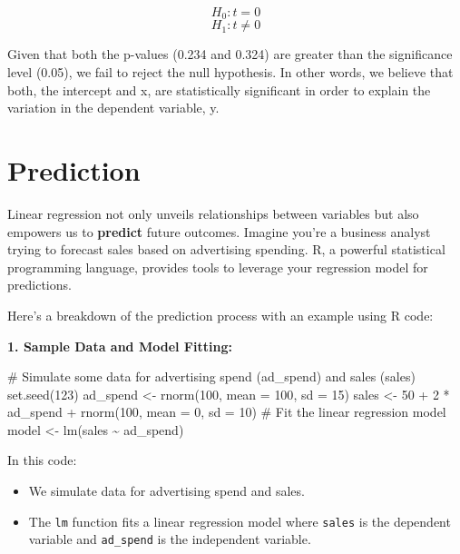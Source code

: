 \documentclass[
  letterpaper,
  paper =a4,
  twoside,
  openright,
  headsepline,
  footsepline,
  listof = totocnumbered,
  chapterprefix = true,
  firstiscover,
  parskip = full*]{scrbook}
\newenvironment{Shaded}{\begin{snugshade}}{\end{snugshade}}
\newcommand{\AttributeTok}[1]{\textcolor[rgb]{0.40,0.45,0.13}{#1}}
\newcommand{\CommentTok}[1]{\textcolor[rgb]{0.37,0.37,0.37}{#1}}
\newcommand{\DecValTok}[1]{\textcolor[rgb]{0.68,0.00,0.00}{#1}}
\newcommand{\FunctionTok}[1]{\textcolor[rgb]{0.28,0.35,0.67}{#1}}
\newcommand{\NormalTok}[1]{\textcolor[rgb]{0.00,0.23,0.31}{#1}}
\newcommand{\OtherTok}[1]{\textcolor[rgb]{0.00,0.23,0.31}{#1}}
\newcommand{\SpecialCharTok}[1]{\textcolor[rgb]{0.37,0.37,0.37}{#1}}
\begin{document}
\[
H_0: t = 0
\] \[
H_1: t \neq 0
\]

Given that both the p-values (0.234 and 0.324) are greater than the
significance level (0.05), we fail to reject the null hypothesis. In
other words, we believe that both, the intercept and x, are
statistically significant in order to explain the variation in the
dependent variable, y.

\section{Prediction}\label{prediction}

Linear regression not only unveils relationships between variables but
also empowers us to \textbf{predict} future outcomes. Imagine you're a
business analyst trying to forecast sales based on advertising spending.
R, a powerful statistical programming language, provides tools to
leverage your regression model for predictions.

Here's a breakdown of the prediction process with an example using R
code:

\textbf{1. Sample Data and Model Fitting:}

\begin{Shaded}
\begin{Highlighting}[]
\CommentTok{\# Simulate some data for advertising spend (ad\_spend) and sales (sales) }
\FunctionTok{set.seed}\NormalTok{(}\DecValTok{123}\NormalTok{) }
\NormalTok{ad\_spend }\OtherTok{\textless{}{-}} \FunctionTok{rnorm}\NormalTok{(}\DecValTok{100}\NormalTok{, }\AttributeTok{mean =} \DecValTok{100}\NormalTok{, }\AttributeTok{sd =} \DecValTok{15}\NormalTok{) }
\NormalTok{sales }\OtherTok{\textless{}{-}} \DecValTok{50} \SpecialCharTok{+} \DecValTok{2} \SpecialCharTok{*}\NormalTok{ ad\_spend }\SpecialCharTok{+} \FunctionTok{rnorm}\NormalTok{(}\DecValTok{100}\NormalTok{, }\AttributeTok{mean =} \DecValTok{0}\NormalTok{, }\AttributeTok{sd =} \DecValTok{10}\NormalTok{)  }
\CommentTok{\# Fit the linear regression model}
\NormalTok{model }\OtherTok{\textless{}{-}} \FunctionTok{lm}\NormalTok{(sales }\SpecialCharTok{\textasciitilde{}}\NormalTok{ ad\_spend)}
\end{Highlighting}
\end{Shaded}

In this code:

\begin{itemize}
\item
  We simulate data for advertising spend and sales.
\item
  The \texttt{lm} function fits a linear regression model where
  \texttt{sales} is the dependent variable and \texttt{ad\_spend} is the
  independent variable.
\end{itemize}
\end{document}

